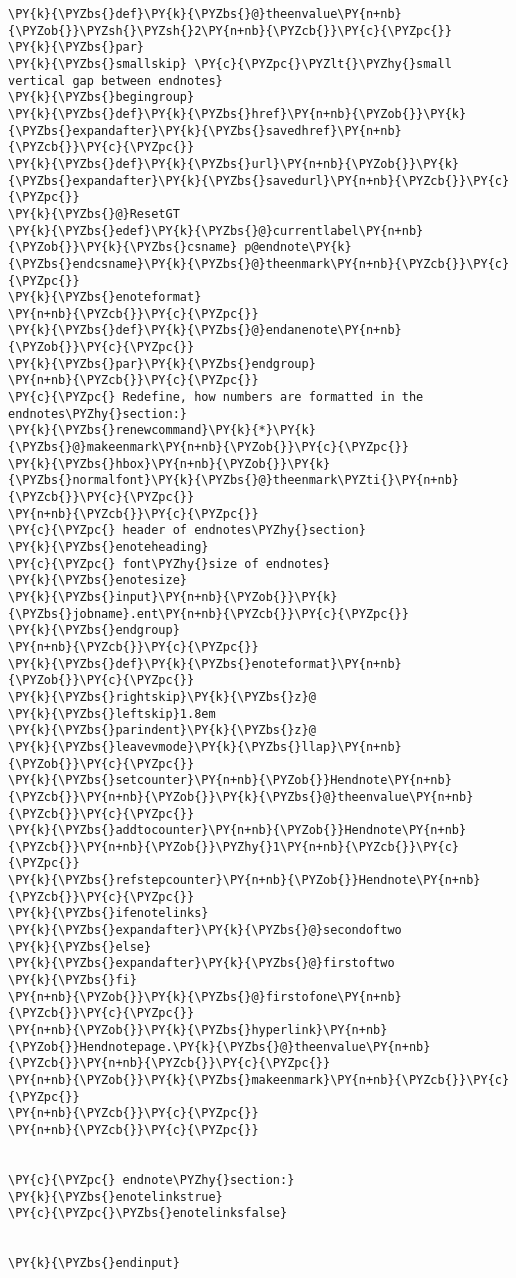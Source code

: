 \begin{Verbatim}[commandchars=\\\{\}]
\PY{k}{\PYZbs{}def}\PY{k}{\PYZbs{}@}theenvalue\PY{n+nb}{\PYZob{}}\PYZsh{}\PYZsh{}2\PY{n+nb}{\PYZcb{}}\PY{c}{\PYZpc{}}
\PY{k}{\PYZbs{}par}
\PY{k}{\PYZbs{}smallskip} \PY{c}{\PYZpc{}\PYZlt{}\PYZhy{}small vertical gap between endnotes}
\PY{k}{\PYZbs{}begingroup}
\PY{k}{\PYZbs{}def}\PY{k}{\PYZbs{}href}\PY{n+nb}{\PYZob{}}\PY{k}{\PYZbs{}expandafter}\PY{k}{\PYZbs{}savedhref}\PY{n+nb}{\PYZcb{}}\PY{c}{\PYZpc{}}
\PY{k}{\PYZbs{}def}\PY{k}{\PYZbs{}url}\PY{n+nb}{\PYZob{}}\PY{k}{\PYZbs{}expandafter}\PY{k}{\PYZbs{}savedurl}\PY{n+nb}{\PYZcb{}}\PY{c}{\PYZpc{}}
\PY{k}{\PYZbs{}@}ResetGT
\PY{k}{\PYZbs{}edef}\PY{k}{\PYZbs{}@}currentlabel\PY{n+nb}{\PYZob{}}\PY{k}{\PYZbs{}csname} p@endnote\PY{k}{\PYZbs{}endcsname}\PY{k}{\PYZbs{}@}theenmark\PY{n+nb}{\PYZcb{}}\PY{c}{\PYZpc{}}
\PY{k}{\PYZbs{}enoteformat}
\PY{n+nb}{\PYZcb{}}\PY{c}{\PYZpc{}}
\PY{k}{\PYZbs{}def}\PY{k}{\PYZbs{}@}endanenote\PY{n+nb}{\PYZob{}}\PY{c}{\PYZpc{}}
\PY{k}{\PYZbs{}par}\PY{k}{\PYZbs{}endgroup}
\PY{n+nb}{\PYZcb{}}\PY{c}{\PYZpc{}}
\PY{c}{\PYZpc{} Redefine, how numbers are formatted in the endnotes\PYZhy{}section:}
\PY{k}{\PYZbs{}renewcommand}\PY{k}{*}\PY{k}{\PYZbs{}@}makeenmark\PY{n+nb}{\PYZob{}}\PY{c}{\PYZpc{}}
\PY{k}{\PYZbs{}hbox}\PY{n+nb}{\PYZob{}}\PY{k}{\PYZbs{}normalfont}\PY{k}{\PYZbs{}@}theenmark\PYZti{}\PY{n+nb}{\PYZcb{}}\PY{c}{\PYZpc{}}
\PY{n+nb}{\PYZcb{}}\PY{c}{\PYZpc{}}
\PY{c}{\PYZpc{} header of endnotes\PYZhy{}section}
\PY{k}{\PYZbs{}enoteheading}
\PY{c}{\PYZpc{} font\PYZhy{}size of endnotes}
\PY{k}{\PYZbs{}enotesize}
\PY{k}{\PYZbs{}input}\PY{n+nb}{\PYZob{}}\PY{k}{\PYZbs{}jobname}.ent\PY{n+nb}{\PYZcb{}}\PY{c}{\PYZpc{}}
\PY{k}{\PYZbs{}endgroup}
\PY{n+nb}{\PYZcb{}}\PY{c}{\PYZpc{}}
\PY{k}{\PYZbs{}def}\PY{k}{\PYZbs{}enoteformat}\PY{n+nb}{\PYZob{}}\PY{c}{\PYZpc{}}
\PY{k}{\PYZbs{}rightskip}\PY{k}{\PYZbs{}z}@
\PY{k}{\PYZbs{}leftskip}1.8em
\PY{k}{\PYZbs{}parindent}\PY{k}{\PYZbs{}z}@
\PY{k}{\PYZbs{}leavevmode}\PY{k}{\PYZbs{}llap}\PY{n+nb}{\PYZob{}}\PY{c}{\PYZpc{}}
\PY{k}{\PYZbs{}setcounter}\PY{n+nb}{\PYZob{}}Hendnote\PY{n+nb}{\PYZcb{}}\PY{n+nb}{\PYZob{}}\PY{k}{\PYZbs{}@}theenvalue\PY{n+nb}{\PYZcb{}}\PY{c}{\PYZpc{}}
\PY{k}{\PYZbs{}addtocounter}\PY{n+nb}{\PYZob{}}Hendnote\PY{n+nb}{\PYZcb{}}\PY{n+nb}{\PYZob{}}\PYZhy{}1\PY{n+nb}{\PYZcb{}}\PY{c}{\PYZpc{}}
\PY{k}{\PYZbs{}refstepcounter}\PY{n+nb}{\PYZob{}}Hendnote\PY{n+nb}{\PYZcb{}}\PY{c}{\PYZpc{}}
\PY{k}{\PYZbs{}ifenotelinks}
\PY{k}{\PYZbs{}expandafter}\PY{k}{\PYZbs{}@}secondoftwo
\PY{k}{\PYZbs{}else}
\PY{k}{\PYZbs{}expandafter}\PY{k}{\PYZbs{}@}firstoftwo
\PY{k}{\PYZbs{}fi}
\PY{n+nb}{\PYZob{}}\PY{k}{\PYZbs{}@}firstofone\PY{n+nb}{\PYZcb{}}\PY{c}{\PYZpc{}}
\PY{n+nb}{\PYZob{}}\PY{k}{\PYZbs{}hyperlink}\PY{n+nb}{\PYZob{}}Hendnotepage.\PY{k}{\PYZbs{}@}theenvalue\PY{n+nb}{\PYZcb{}}\PY{n+nb}{\PYZcb{}}\PY{c}{\PYZpc{}}
\PY{n+nb}{\PYZob{}}\PY{k}{\PYZbs{}makeenmark}\PY{n+nb}{\PYZcb{}}\PY{c}{\PYZpc{}}
\PY{n+nb}{\PYZcb{}}\PY{c}{\PYZpc{}}
\PY{n+nb}{\PYZcb{}}\PY{c}{\PYZpc{}}


\PY{c}{\PYZpc{} endnote\PYZhy{}section:}
\PY{k}{\PYZbs{}enotelinkstrue}
\PY{c}{\PYZpc{}\PYZbs{}enotelinksfalse}


\PY{k}{\PYZbs{}endinput}
\end{Verbatim}
